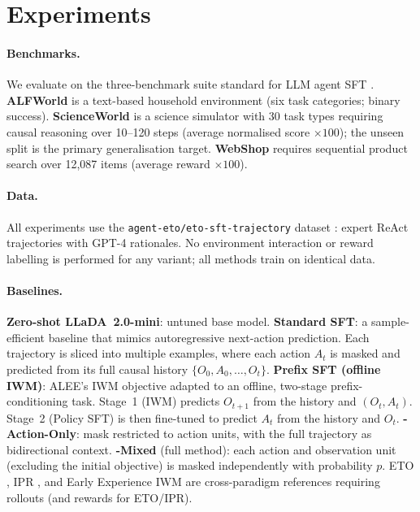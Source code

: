 \section{Experiments}
\label{sec:experiments}

\paragraph{Benchmarks.}
We evaluate on the three-benchmark suite standard for LLM agent SFT
\citep{song2024eto,zhang2024ipr,zhang2025alee}.
\textbf{ALFWorld} \citep{shridhar2021alfworld} is a text-based household
environment (six task categories; binary success).
\textbf{ScienceWorld} \citep{wang2022scienceworld} is a science simulator with
30 task types requiring causal reasoning over 10--120 steps
(average normalised score $\times100$); the unseen split is the primary
generalisation target.
\textbf{WebShop} \citep{yao2022webshop} requires sequential product search over
12,087 items (average reward $\times100$).

\paragraph{Data.}
All experiments use the \texttt{agent-eto/eto-sft-trajectory} dataset
\citep{song2024eto}: expert ReAct trajectories with GPT-4 rationales.
No environment interaction or reward labelling is performed for any variant;
all methods train on identical data.

\paragraph{Baselines.}
\textbf{Zero-shot LLaDA~2.0-mini}: untuned base model.
\textbf{Standard SFT}: a sample-efficient baseline that mimics autoregressive
next-action prediction. Each trajectory is sliced into multiple examples,
where each action $A_t$ is masked and predicted from its full causal history
$\{O_0, A_0, \ldots, O_t\}$.
\textbf{Prefix SFT (offline IWM)}: ALEE's IWM objective adapted to an offline,
two-stage prefix-conditioning task.
Stage~1 (IWM) predicts $O_{t+1}$ from the history and $(O_t, A_t)$.
Stage~2 (Policy SFT) is then fine-tuned to predict $A_t$ from the history and $O_t$.
\textbf{\aomt{}-Action-Only}: mask restricted to action units, with the full
trajectory as bidirectional context.
\textbf{\aomt{}-Mixed} (full method): each action and observation unit
(excluding the initial objective) is masked independently with probability $p$.
ETO \citep{song2024eto}, IPR \citep{zhang2024ipr}, and Early Experience IWM
\citep{zhang2025alee} are cross-paradigm references requiring rollouts
(and rewards for ETO/IPR).

